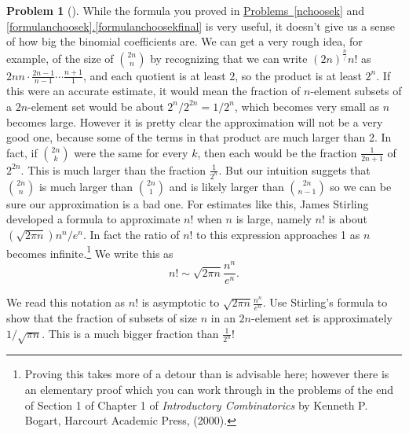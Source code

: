 \documentclass[10pt,]{book}
\theoremstyle{plain}
\theoremstyle{definition}
\newtheorem{activity}[project]{Problem}
\theoremstyle{definition}
\numberwithin{equation}{chapter}
\newcommand{\importantarrow}{\Rightarrow}
\begin{document}
\begin{activity}[]\marginsymbol[-1em]{\pdftooltip{$\importantarrow$}{especially interesting}} \label{Stirling_sapproximation}
While the formula you proved in \hyperref[nchoosek]{Problems~\ref{nchoosek}} and \hyperref[formulanchoosekfinal]{\ref{formulanchoosek}.\ref{formulanchoosekfinal}} is very useful, it doesn't give us a sense of how big the binomial coefficients are. We can get a very rough idea, for example, of the size of \(\binom{2n}{n}\) by recognizing that we can write \((2n)^\frac{\underline{n}}/n!\) as \({2n}{n}\cdot
\frac{2n-1}{n-1}\cdots \frac{n+1}{1}\), and each quotient is at least \(2\), so the product is at least \(2^n\). If this were an accurate estimate, it would mean the fraction of \(n\)-element subsets of a \(2n\)-element set would be about         \(2^n/2^{2n}=1/2^n\), which becomes very small as \(n\) becomes large. However it is pretty clear the approximation will not be a very good one, because some of the terms in that product are much larger than 2. In fact, if \(\binom{2n}{k}\) were the same for every \(k\), then each would be the fraction \(\frac{1}{2n+1}\) of \(2^{2n}\). This is much larger than the fraction \(\frac{1}{2^n}\). But our intuition suggets that \(\binom{2n}{n}\) is much larger than \(\binom{2n}{1}\) and is likely larger than \(\binom{2n}{n-1}\) so we can be sure our approximation is a bad one. For estimates like this, James Stirling developed a formula to approximate \(n!\) when \(n\) is large, namely \(n!\) is about \(\left(\sqrt{2\pi
n}\right){n^n/ e^n}\). In fact the ratio of \(n!\) to this expression approaches 1 as \(n\) becomes infinite.\footnote{Proving this takes more of a detour than is advisable here; however there is an elementary proof which you can work through in the problems of the end of Section 1 of Chapter 1 of \emph{Introductory Combinatorics} by Kenneth P. Bogart, Harcourt Academic Press, (2000).\label{fn-2}} We write this as%
\begin{equation*}
n!\sim \sqrt{2\pi
n}\frac{n^n}{e^n}.
\end{equation*}
%
\par
We read this notation as \(n!\) is asymptotic to \(\sqrt{2\pi n}\frac{n^n}{e^n}\). Use Stirling's formula to show that the fraction of subsets of size \(n\) in an \(2n\)-element set is approximately \(1/\sqrt{\pi n}\). This is a much bigger fraction than \(\frac{1}{2^n}\)!%
\end{activity}
\typeout{************************************************}
\typeout{************************************************}
\end{document}
